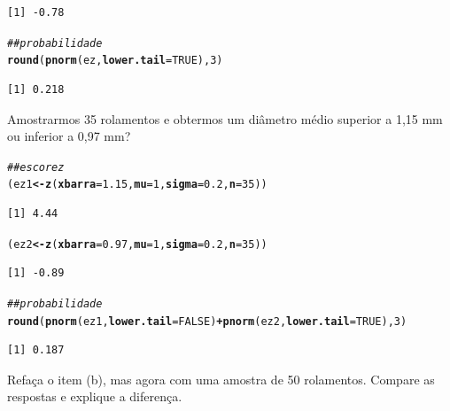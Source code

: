 \documentclass[a4paper,11pt,fleqn]{article}\usepackage[]{graphicx}\usepackage[]{color}
\makeatletter
\newcommand{\hlnum}[1]{\textcolor[rgb]{0,0,0}{#1}}%
\newcommand{\hlcom}[1]{\textcolor[rgb]{0.4,0.4,0.4}{\textit{#1}}}%
\newcommand{\hlopt}[1]{\textcolor[rgb]{0,0,0}{\textbf{#1}}}%
\newcommand{\hlstd}[1]{\textcolor[rgb]{0,0,0}{#1}}%
\newcommand{\hlkwb}[1]{\textcolor[rgb]{0,0,0}{\textbf{#1}}}%
\newcommand{\hlkwc}[1]{\textcolor[rgb]{0,0,0}{\textbf{#1}}}%
\newcommand{\hlkwd}[1]{\textcolor[rgb]{0,0,0}{\textbf{#1}}}%
\newenvironment{kframe}{%
 \def\at@end@of@kframe{}%
 \ifinner\ifhmode%
  \def\at@end@of@kframe{\end{minipage}}%
  \begin{minipage}{\columnwidth}%
 \fi\fi%
 \def\FrameCommand##1{\hskip\@totalleftmargin \hskip-\fboxsep
 \colorbox{shadecolor}{##1}\hskip-\fboxsep
     \hskip-\linewidth \hskip-\@totalleftmargin \hskip\columnwidth}%
 \MakeFramed {\advance\hsize-\width
   \@totalleftmargin\z@ \linewidth\hsize
   \@setminipage}}%
 {\par\unskip\endMakeFramed%
 \at@end@of@kframe}
\newenvironment{knitrout}{}{} %
\theoremstyle{definition}
\makeatother
\begin{document}
\begin{compactenum}[1.]
\begin{compactenum}
\begin{knitrout}
\begin{kframe}
\begin{verbatim}
[1] -0.78
\end{verbatim}
\begin{alltt}
\hlcom{## probabilidade}
\hlkwd{round}\hlstd{(}\hlkwd{pnorm}\hlstd{(ez,} \hlkwc{lower.tail} \hlstd{=} \hlnum{TRUE}\hlstd{),} \hlnum{3}\hlstd{)}
\end{alltt}
\begin{verbatim}
[1] 0.218
\end{verbatim}
\end{kframe}
\end{knitrout}
  \item Amostrarmos 35 rolamentos e obtermos um diâmetro médio superior
    a 1,15 mm ou inferior a 0,97 mm?
\begin{knitrout}\small
{}\color{fgcolor}\begin{kframe}
\begin{alltt}
\hlcom{## escore z}
\hlstd{(ez1} \hlkwb{<-} \hlkwd{z}\hlstd{(}\hlkwc{xbarra} \hlstd{=} \hlnum{1.15}\hlstd{,} \hlkwc{mu} \hlstd{=} \hlnum{1}\hlstd{,} \hlkwc{sigma} \hlstd{=} \hlnum{0.2}\hlstd{,} \hlkwc{n} \hlstd{=} \hlnum{35}\hlstd{))}
\end{alltt}
\begin{verbatim}
[1] 4.44
\end{verbatim}
\begin{alltt}
\hlstd{(ez2} \hlkwb{<-} \hlkwd{z}\hlstd{(}\hlkwc{xbarra} \hlstd{=} \hlnum{0.97}\hlstd{,} \hlkwc{mu} \hlstd{=} \hlnum{1}\hlstd{,} \hlkwc{sigma} \hlstd{=} \hlnum{0.2}\hlstd{,} \hlkwc{n} \hlstd{=} \hlnum{35}\hlstd{))}
\end{alltt}
\begin{verbatim}
[1] -0.89
\end{verbatim}
\begin{alltt}
\hlcom{## probabilidade}
\hlkwd{round}\hlstd{(}\hlkwd{pnorm}\hlstd{(ez1,} \hlkwc{lower.tail} \hlstd{=} \hlnum{FALSE}\hlstd{)} \hlopt{+} \hlkwd{pnorm}\hlstd{(ez2,} \hlkwc{lower.tail} \hlstd{=} \hlnum{TRUE}\hlstd{),} \hlnum{3}\hlstd{)}
\end{alltt}
\begin{verbatim}
[1] 0.187
\end{verbatim}
\end{kframe}
\end{knitrout}
  \item Refaça o item (b), mas agora com uma amostra de 50
    rolamentos. Compare as respostas e explique a diferença.
\begin{knitrout}\small

\end{knitrout}
\end{compactenum}
\end{compactenum}
\end{document}
